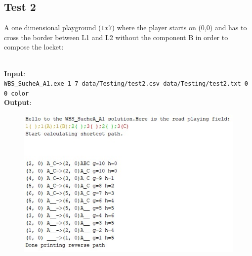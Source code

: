 \documentclass{article}
\begin{document}
\subsection{Test 2}
A one dimensional playground ($1 x 7$) where the player starts on (0,0) and has to cross the border between L1 and L2 without the component B in order to compose the locket:\\ 

\\
\textbf{Input}:\\
\texttt{WBS\_SucheA\_A1.exe 1 7 data/Testing/test2.csv data/Testing/test2.txt 0 0 color}\\
\textbf{Output}:
\begin{figure}[H]
\includegraphics[width=14cm]{test2}
\centering
\end{figure}
\end{document}
